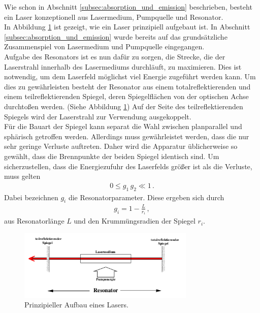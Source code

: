 Wie schon in Abschnitt \ref{subsec:absorption_und_emission}
beschrieben, besteht ein Laser konzeptionell aus Lasermedium,
Pumpquelle und Resonator.\\
In Abbildung \ref{fig:laserkonzept} ist gezeigt,
wie ein Laser prinzipiell aufgebaut ist.
In Abschnitt \ref{subsec:absorption_und_emission}
wurde bereits auf das grundsätzliche Zusammenspiel von Lasermedium
und Pumpquelle eingegangen.\\
Aufgabe des Resonators ist es nun dafür zu sorgen,
die Strecke, die der Laserstrahl innerhalb
des Lasermediums durchläuft, zu maximieren. Dies ist notwendig,
um dem Laserfeld möglichst viel Energie zugeführt
werden kann. Um dies zu gewährleisten besteht der Resonator
aus einem totalreflektierenden und einem teilreflektierenden Spiegel,
deren Spiegelflächen von der optischen Achse durchtoßen werden.
(Siehe Abbildung \ref{fig:laserkonzept})
Auf der Seite des teilreflektierenden Spiegels wird der Laserstrahl
zur Verwendung ausgekoppelt.\\
Für die Bauart der Spiegel kann separat die Wahl zwischen planparallel und
sphärisch getroffen werden. Allerdings muss gewährleistet werden, dass
die nur sehr geringe Verluste auftreten. Daher wird
die Apparatur üblicherweise so gewählt, dass die Brennpunkte der beiden Spiegel
identisch sind.
Um sicherzustellen, dass die Energiezufuhr des Laserfelds größer ist als
die Verluste, muss gelten
\begin{align}
  0 \leq g_{1} \, g_{2} \ll 1 \, .
\end{align}
Dabei bezeichnen $g_{i}$ die Resonatorparameter.
Diese ergeben sich durch
\begin{align}
  g_{i} = 1 - \frac{L}{r_{i}} \, ,
\end{align}
aus Resonatorlänge $L$ und den Krummüngsradien der Spiegel $r_{i}$.

\FloatBarrier
\begin{figure}
  \centering
  \includegraphics[width=0.75\textwidth]{figures/laserkonzept.png}
  \caption{Prinzipieller Aufbau eines Lasers.\cite{sample}}
  \label{fig:laserkonzept}
\end{figure}
\FloatBarrier

